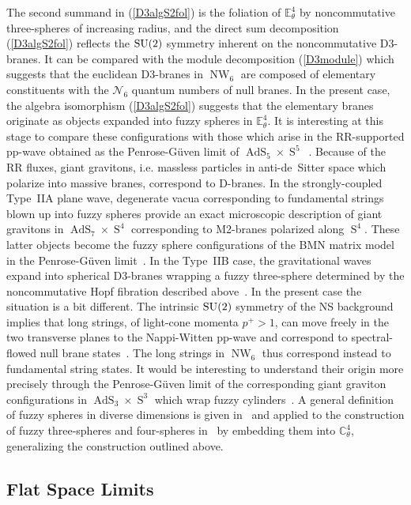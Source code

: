 \documentclass[11pt,a4paper]{article}
\DeclareMathOperator{\AdS}{AdS}
\DeclareMathOperator{\Sphere}{S}
\DeclareMathOperator{\NW}{NW}
\let\S\Sphere
\newcommand{\complex}{{\mathbb C}} %
\newcommand{\eucl}{{\mathbb E}}
\begin{document}
The second summand in (\ref{D3algS2fol}) is the foliation of $\eucl_\theta^4$
by noncommutative three-spheres of increasing radius, and the direct sum
decomposition (\ref{D3algS2fol}) reflects the ${\rm SU}(2)$ symmetry inherent
on the noncommutative D3-branes. It can be compared with the module
decomposition (\ref{D3module}) which suggests that the euclidean D3-branes in
$\NW_6$ are composed of elementary constituents with the
$\mathcal{N}_6$ quantum numbers of null branes. In the present case,
the algebra isomorphism (\ref{D3algS2fol}) suggests that the
elementary branes originate as objects expanded into fuzzy spheres in
$\eucl_\theta^4$. It is interesting at this stage to compare these
configurations with those which arise in the RR-supported pp-wave obtained as
the Penrose-G\"uven limit of $\AdS_5\times\S^5$~\cite{BFHP1}. Because
of the RR fluxes, giant gravitons, i.e. massless particles in
anti-de~Sitter space which polarize into massive
branes, correspond to D-branes. In the strongly-coupled Type~IIA plane wave,
degenerate vacua corresponding to fundamental strings blown up into fuzzy
spheres provide an exact microscopic description of giant gravitons in
$\AdS_7\times\S^4$ corresponding to M2-branes polarized along $\S^4$. These
latter objects become the fuzzy sphere configurations of the BMN matrix model
in the Penrose-G\"uven limit~\cite{BMN1}. In the Type~IIB case, the
gravitational waves expand into spherical D3-branes wrapping a fuzzy
three-sphere determined by the noncommutative Hopf fibration described
above~\cite{JLR-G1,S-J1}. In the present case the
situation is a bit different. The intrinsic ${\rm SU}(2)$ symmetry of the NS
background implies that long strings, of light-cone momenta $p^+>1$, can move
freely in the two transverse planes to the Nappi-Witten pp-wave and correspond
to spectral-flowed null brane states~\cite{BAKZ1}. The long strings in
$\NW_6$ thus correspond instead to fundamental string states. It would
be interesting to understand their origin more precisely through the
Penrose-G\"uven limit of the corresponding giant graviton
configurations in $\AdS_3\times\S^3$ which wrap fuzzy
cylinders~\cite{JLR-G2}. A general definition of fuzzy spheres in
diverse dimensions is given in~\cite{S-J1} and applied to the
construction of fuzzy three-spheres and four-spheres in~\cite{S-JT1}
by embedding them into $\complex^4_\theta$, generalizing the
construction outlined above.

\subsection{Flat Space Limits\label{FlatLim}}
\end{document}
